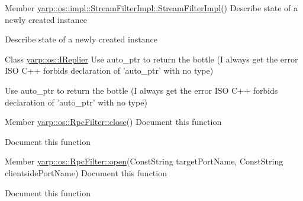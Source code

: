 \label{todo__todo000004}
\hypertarget{todo__todo000004}{}
 
\begin{DoxyDescription}
\item[Member \hyperlink{classyarp_1_1os_1_1impl_1_1_stream_filter_impl_a34b63ca7d32244a7c0ec974ce7d3c2f2}{yarp::os::impl::StreamFilterImpl::StreamFilterImpl}() ]Describe state of a newly created instance 

Describe state of a newly created instance 
\end{DoxyDescription}

\label{todo__todo000007}
\hypertarget{todo__todo000007}{}
 
\begin{DoxyDescription}
\item[Class \hyperlink{classyarp_1_1os_1_1_i_replier}{yarp::os::IReplier} ]Use auto\_\-ptr to return the bottle (I always get the error ISO C++ forbids declaration of 'auto\_\-ptr' with no type) 

Use auto\_\-ptr to return the bottle (I always get the error ISO C++ forbids declaration of 'auto\_\-ptr' with no type) 
\end{DoxyDescription}

\label{todo__todo000019}
\hypertarget{todo__todo000019}{}
 
\begin{DoxyDescription}
\item[Member \hyperlink{classyarp_1_1os_1_1_rpc_filter_a8bbb27455374614e29987fc7dc84aead}{yarp::os::RpcFilter::close}() ]Document this function 

Document this function 
\end{DoxyDescription}

\label{todo__todo000018}
\hypertarget{todo__todo000018}{}
 
\begin{DoxyDescription}
\item[Member \hyperlink{classyarp_1_1os_1_1_rpc_filter_a5e5998e39055ac1d5fd9556e2a784478}{yarp::os::RpcFilter::open}(ConstString targetPortName, ConstString clientsidePortName) ]Document this function 

Document this function 
\end{DoxyDescription}